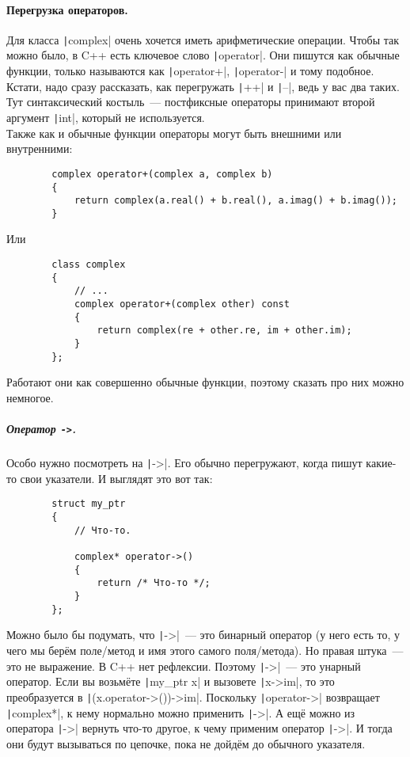 \documentclass{article}
\begin{document}
    \paragraph{Перегрузка операторов.}
    Для класса \texttt|complex| очень хочется иметь арифметические операции. Чтобы так можно было, в C++ есть ключевое слово \texttt|operator|. Они пишутся как обычные функции, только называются как \texttt|operator+|, \texttt|operator-| и тому подобное. Кстати, надо сразу рассказать, как перегружать \texttt|++| и \texttt|--|, ведь у вас два таких. Тут синтаксический костыль~--- постфиксные операторы принимают второй аргумент \texttt|int|, который не используется.\\
    Также как и обычные функции операторы могут быть внешними или внутренними:
    \begin{verbatim}
        complex operator+(complex a, complex b)
        {
            return complex(a.real() + b.real(), a.imag() + b.imag());
        }
    \end{verbatim}
    Или
    \begin{verbatim}
        class complex
        {
            // ...
            complex operator+(complex other) const
            {
                return complex(re + other.re, im + other.im);
            }
        };
    \end{verbatim}
    Работают они как совершенно обычные функции, поэтому сказать про них можно немногое.
    \subparagraph{Оператор \texttt{->}.}
    Особо нужно посмотреть на \texttt|->|. Его обычно перегружают, когда пишут какие-то свои указатели. И выглядят это вот так:
    \begin{verbatim}
        struct my_ptr
        {
            // Что-то.

            complex* operator->()
            {
                return /* Что-то */;
            }
        };
    \end{verbatim}
    Можно было бы подумать, что \texttt|->|~--- это бинарный оператор (у него есть то, у чего мы берём поле/метод и имя этого самого поля/метода). Но правая штука~--- это не выражение. В C++ нет рефлексии. Поэтому \texttt|->|~--- это унарный оператор. Если вы возьмёте \texttt|my_ptr x| и вызовете \texttt|x->im|, то это преобразуется в \texttt|(x.operator->())->im|. Поскольку \texttt|operator->| возвращает \texttt|complex*|, к нему нормально можно применить \texttt|->|. А ещё можно из оператора \texttt|->| вернуть что-то другое, к чему применим оператор \texttt|->|. И тогда они будут вызываться по цепочке, пока не дойдём до обычного указателя.
\end{document}
